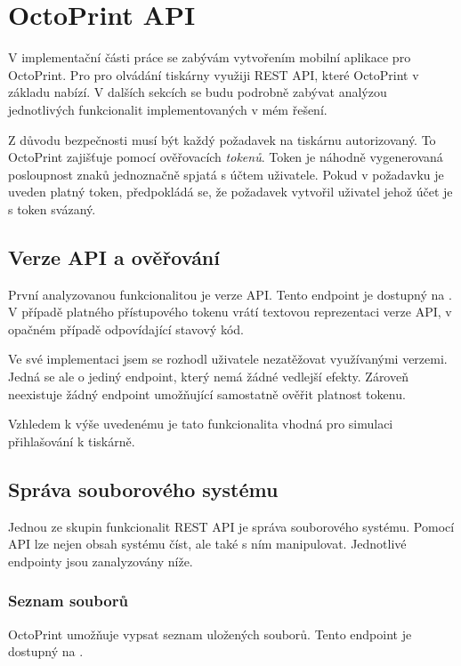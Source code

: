 \section{OctoPrint API}

V implementační části práce se zabývám vytvořením mobilní aplikace pro OctoPrint.
Pro pro olvádání tiskárny využiji REST API, které OctoPrint v základu nabízí.
V dalších sekcích se budu podrobně zabývat analýzou jednotlivých funkcionalit implementovaných v mém řešení.

Z důvodu bezpečnosti musí být každý požadavek na tiskárnu autorizovaný.
To OctoPrint zajišťuje pomocí ověřovacích \textit{tokenů}.
Token je náhodně vygenerovaná posloupnost znaků jednoznačně spjatá s účtem uživatele.
Pokud v požadavku je uveden platný token, předpokládá se, že požadavek vytvořil uživatel jehož účet je s token svázaný.

\subsection{Verze API a ověřování}

První analyzovanou funkcionalitou je verze API.
Tento endpoint je dostupný na .
V případě platného přístupového tokenu vrátí textovou reprezentaci verze API, v opačném případě odpovídající stavový kód.

Ve své implementaci jsem se rozhodl uživatele nezatěžovat využívanými verzemi.
Jedná se ale o jediný endpoint, který nemá žádné vedlejší efekty.
Zároveň neexistuje žádný endpoint umožňující samostatně ověřit platnost tokenu.

Vzhledem k výše uvedenému je tato funkcionalita vhodná pro simulaci přihlašování k tiskárně.

\subsection{Správa souborového systému}

Jednou ze skupin funkcionalit REST API je správa souborového systému.
Pomocí API lze nejen obsah systému číst, ale také s ním manipulovat.
Jednotlivé endpointy jsou zanalyzovány níže.

\subsubsection*{Seznam souborů}

OctoPrint umožňuje vypsat seznam uložených souborů.
Tento endpoint je dostupný na .

